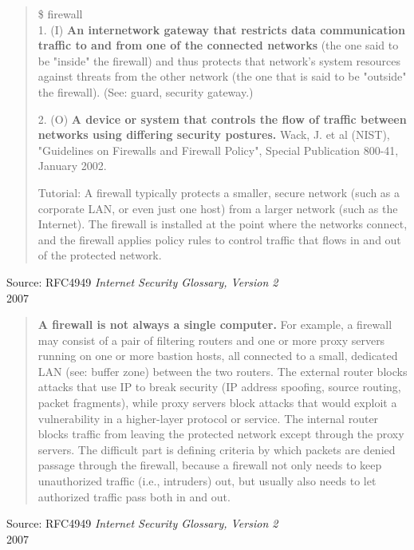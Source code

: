 \documentclass[Screen16to9,17pt]{foils}
\begin{document}
\begin{quote}\small
\$ firewall\\

1. (I) {\bf An internetwork gateway that restricts data communication traffic to and from one of the connected networks} (the one said to be "inside" the firewall) and thus protects that network's system resources against threats from the other network (the one that is said to be "outside" the firewall). (See: guard, security gateway.)

2. (O) {\bf A device or system that controls the flow of traffic between networks using differing security postures.} Wack, J. et al (NIST), "Guidelines on Firewalls and Firewall Policy", Special Publication 800-41, January 2002.

Tutorial: A firewall typically protects a smaller, secure network (such as a corporate LAN, or even just one host) from a larger network (such as the Internet). The firewall is installed at the point where the networks connect, and the firewall applies policy rules to control traffic that flows in and out of the protected network.
\end{quote}
{\footnotesize Source: RFC4949 \emph{Internet Security Glossary, Version 2}\\
 2007}

\begin{quote}\small
{\bf A firewall is not always a single computer.} For example, a firewall may consist of a pair of filtering routers and one or more proxy servers running on one or more bastion hosts, all connected to a small, dedicated LAN (see: buffer zone) between the two routers. The external router blocks attacks that use IP to break security (IP address spoofing, source routing, packet fragments), while proxy servers block attacks that would exploit a vulnerability in a higher-layer protocol or service. The internal router blocks traffic from leaving the protected network except through the proxy servers. The difficult part is defining criteria by which packets are denied passage through the firewall, because a firewall not only needs to keep unauthorized traffic (i.e., intruders) out, but usually also needs to let authorized traffic pass both in and out.
\end{quote}
{\footnotesize Source: RFC4949 \emph{Internet Security Glossary, Version 2}\\
 2007}
\end{document}
